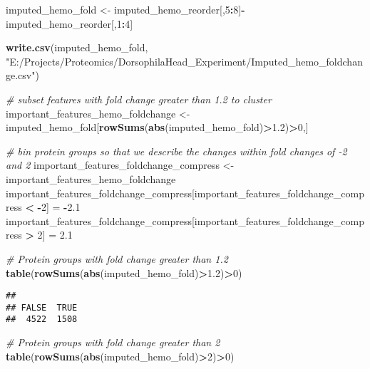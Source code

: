 \documentclass[]{article}
\newenvironment{Shaded}{\begin{snugshade}}{\end{snugshade}}
\newcommand{\KeywordTok}[1]{\textcolor[rgb]{0.13,0.29,0.53}{\textbf{#1}}}
\newcommand{\DecValTok}[1]{\textcolor[rgb]{0.00,0.00,0.81}{#1}}
\newcommand{\FloatTok}[1]{\textcolor[rgb]{0.00,0.00,0.81}{#1}}
\newcommand{\StringTok}[1]{\textcolor[rgb]{0.31,0.60,0.02}{#1}}
\newcommand{\CommentTok}[1]{\textcolor[rgb]{0.56,0.35,0.01}{\textit{#1}}}
\newcommand{\OperatorTok}[1]{\textcolor[rgb]{0.81,0.36,0.00}{\textbf{#1}}}
\newcommand{\NormalTok}[1]{#1}
\begin{document}
\begin{Shaded}
\begin{Highlighting}[]
\NormalTok{imputed_hemo_fold <-}\StringTok{ }\NormalTok{imputed_hemo_reorder[,}\DecValTok{5}\OperatorTok{:}\DecValTok{8}\NormalTok{]}\OperatorTok{-}\NormalTok{imputed_hemo_reorder[,}\DecValTok{1}\OperatorTok{:}\DecValTok{4}\NormalTok{]}

\KeywordTok{write.csv}\NormalTok{(imputed_hemo_fold, }\StringTok{"E:/Projects/Proteomics/DorsophilaHead_Experiment/Imputed_hemo_foldchange.csv"}\NormalTok{)}

\CommentTok{# subset features with fold change greater than 1.2 to cluster}
\NormalTok{important_features_hemo_foldchange <-}\StringTok{ }\NormalTok{imputed_hemo_fold[}\KeywordTok{rowSums}\NormalTok{(}\KeywordTok{abs}\NormalTok{(imputed_hemo_fold)}\OperatorTok{>}\FloatTok{1.2}\NormalTok{)}\OperatorTok{>}\DecValTok{0}\NormalTok{,]}

\CommentTok{# bin protein groups so that we describe the changes within fold changes of -2 and 2}
\NormalTok{important_features_foldchange_compress <-}\StringTok{ }\NormalTok{important_features_hemo_foldchange}
\NormalTok{important_features_foldchange_compress[important_features_foldchange_compress }\OperatorTok{<}\StringTok{ }\OperatorTok{-}\DecValTok{2}\NormalTok{] =}\StringTok{ }\OperatorTok{-}\FloatTok{2.1}
\NormalTok{important_features_foldchange_compress[important_features_foldchange_compress }\OperatorTok{>}\StringTok{ }\DecValTok{2}\NormalTok{] =}\StringTok{ }\FloatTok{2.1}

\CommentTok{# Protein groups with fold change greater than 1.2}
\KeywordTok{table}\NormalTok{(}\KeywordTok{rowSums}\NormalTok{(}\KeywordTok{abs}\NormalTok{(imputed_hemo_fold)}\OperatorTok{>}\FloatTok{1.2}\NormalTok{)}\OperatorTok{>}\DecValTok{0}\NormalTok{)}
\end{Highlighting}
\end{Shaded}

\begin{verbatim}
## 
## FALSE  TRUE 
##  4522  1508
\end{verbatim}

\begin{Shaded}
\begin{Highlighting}[]
\CommentTok{# Protein groups with fold change greater than 2}
\KeywordTok{table}\NormalTok{(}\KeywordTok{rowSums}\NormalTok{(}\KeywordTok{abs}\NormalTok{(imputed_hemo_fold)}\OperatorTok{>}\DecValTok{2}\NormalTok{)}\OperatorTok{>}\DecValTok{0}\NormalTok{)}
\end{Highlighting}
\end{Shaded}
\end{document}
